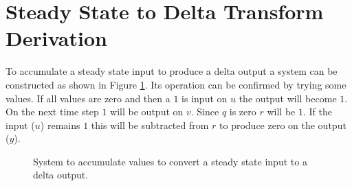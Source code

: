 \documentclass{article}
\begin{document}





\clearpage
\printbibliography[heading=bibintoc]

\clearpage
\appendix

\clearpage
\section{Steady State to Delta Transform Derivation}
\label{app:cdelta}

To accumulate a steady state input to produce a delta output
a system can be constructed as shown in Figure \ref{fig:cd1}.
Its operation can be confirmed by trying some values.
If all values are zero and then a $1$ is input on $u$ the
output will become $1$.
On the next time step $1$ will be output on $v$.
Since $q$ is zero $r$ will be $1$.
If the input ($u$) remains $1$ this will be subtracted from $r$
to produce zero on the output ($y$).

\begin{figure}[hpb!]
\begin{center}


\end{center}

\caption{System to accumulate values to convert a steady state
input to a delta output.}
\label{fig:cd1}
\end{figure}
\end{document}
